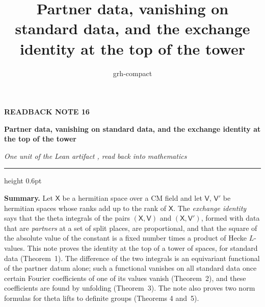 \documentclass[11pt,a4paper]{article}
\title{Partner data, vanishing on standard data, and the exchange identity at the top of the tower}
\author{grh-compact}
\date{}
\theoremstyle{plainx}
\theoremstyle{uprightx}
\newcommand{\sV}{\mathsf{V}}
\newcommand{\sX}{\mathsf{X}}
\begin{document}
\color{ink}

{\raggedright
{\sffamily\bfseries\fontsize{7.2}{9}\selectfont\color{leancol}READBACK NOTE 16\par}
\vspace{5pt}
{\fontsize{21.5}{25.5}\selectfont\bfseries Partner data, vanishing on standard data, and the exchange identity at
the top of the tower\par}
\vspace{5pt}
{\fontsize{12.4}{16}\selectfont\itshape\color{inksoft} One unit of the Lean artifact \ArtifactName, read back into
mathematics\par}}
\vspace{8pt}
{\color{rulegrey}\hrule height 0.6pt}
\vspace{7pt}
\thispagestyle{empty}

\textbf{Summary.} Let $\sX$ be a hermitian space over a CM field and let $\sV$, $\sV'$ be hermitian spaces whose
ranks add up to the rank of $\sX$. The \emph{exchange identity} says that the theta integrals of the pairs
$(\sX,\sV)$ and $(\sX,\sV')$, formed with data that are \emph{partners} at a set of split places, are proportional,
and that the square of the absolute value of the constant is a fixed number times a product of Hecke $L$-values.
This note proves the identity at the top of a tower of spaces, for standard data (Theorem~1). The difference
of the two integrals is an equivariant functional of the partner datum alone; such a functional vanishes on all
standard data once certain Fourier coefficients of one of its values vanish (Theorem~2), and these coefficients
are found by unfolding (Theorem~3). The note also proves two norm formulas for theta lifts to definite groups
(Theorems 4 and~5).
\end{document}
